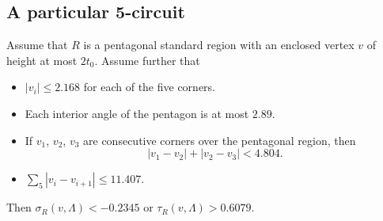 %
%
%
%
%



\subsection{A particular 5-circuit} %

\begin{lemma}\label{lemma:6079}  
Assume that $R$ is a pentagonal standard region
    with an enclosed vertex $v$ of height at most $2t_0$.
    Assume further that
    \begin{itemize}
        \item $|v_i|\le 2.168$ for each of the five corners.
        \item Each interior angle of the pentagon is at most
        $2.89$.
        \item If $v_1$, $v_2$, $v_3$ are consecutive corners over
        the pentagonal region, then $$|v_1-v_2|+|v_2-v_3|<4.804.$$
        \item $\sum_5 |v_i-v_{i+1}|\le 11.407.$
    \end{itemize}
    Then $\sigma_R(v,\Lambda)< -0.2345$ or $\tau_R(v,\Lambda) > 0.6079.$
\end{lemma}

